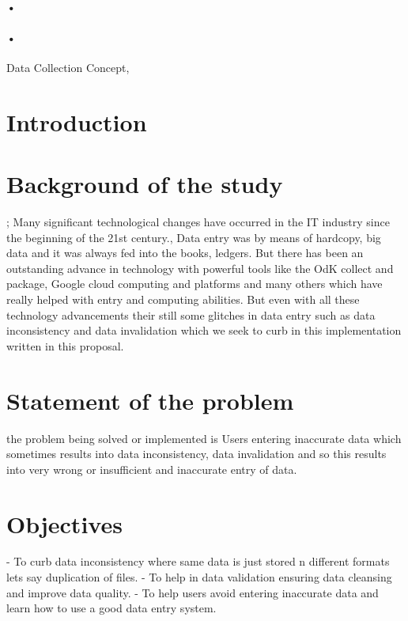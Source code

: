 \documentclass[12pt,]{article}
\begin{document}
\begin{titlepage}
\paragraph*{•}
\paragraph*{•}
  \begin{flushright}
  Data Collection Concept,\\
 
 \tableofcontents

  \end{flushright}
\date{\today}
\end{titlepage}

\newpage



\section{Introduction}
\section{Background of the study}
; Many significant technological changes have occurred in the IT industry since the beginning of the 21st century., Data entry was by means of hardcopy, big data and it was always fed into the books, ledgers. But there has been an outstanding advance in technology with powerful tools like the OdK collect and package, Google cloud computing and platforms and many others which have really helped with entry and computing abilities. But even with all these technology advancements their still some glitches in data entry such as data inconsistency and data invalidation which we seek to curb in this implementation written in this proposal.

\section{
\textbf{Statement of the problem}}
the problem being solved or implemented is Users entering inaccurate data which sometimes results into data inconsistency, data invalidation and so this results into very wrong or insufficient and inaccurate entry of data.

\section{
\textbf{Objectives}}
-	To curb data inconsistency where same data is just stored n different formats lets say duplication of files.
-	To help in data validation ensuring data cleansing and improve data quality.
-	To help users avoid entering inaccurate data and learn how to use a good data entry system.
\end{document}
